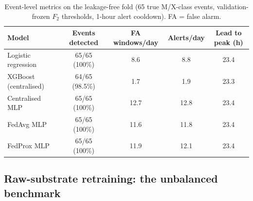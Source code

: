 \begin{table}[t]
\centering
\caption{Event-level metrics on the leakage-free fold (65 true
M/X-class events, validation-frozen $F_2$ thresholds, 1-hour alert
cooldown). FA = false alarm.}
\label{tab:eventlevel}
\small
\begin{tabular}{@{}l c c c c@{}}
\toprule
\textbf{Model} & \textbf{Events detected} & \textbf{FA windows/day} &
\textbf{Alerts/day} & \textbf{Lead to peak (h)} \\
\midrule
Logistic regression & 65/65 (100\%) & 8.6 & 8.8 & 23.4 \\
XGBoost (centralised) & 64/65 (98.5\%) & 1.7 & 1.9 & 23.3 \\
Centralised MLP & 65/65 (100\%) & 12.7 & 12.8 & 23.4 \\
FedAvg MLP & 65/65 (100\%) & 11.6 & 11.8 & 23.4 \\
FedProx MLP & 65/65 (100\%) & 11.9 & 12.1 & 23.4 \\
\bottomrule
\end{tabular}
\end{table}

\subsection{Raw-substrate retraining: the unbalanced benchmark}
\label{sec:res-raw}

